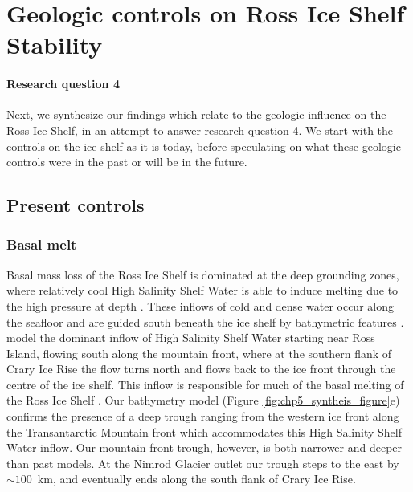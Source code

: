 \section[Geologic controls]{Geologic controls on Ross Ice Shelf Stability}
\paragraph*{Research question 4}

Next, we synthesize our findings which relate to the geologic influence on the Ross Ice Shelf, in an attempt to answer research question 4. We start with the controls on the ice shelf as it is today, before speculating on what these geologic controls were in the past or will be in the future. 

\subsection{Present controls}

\subsubsection{Basal melt}
Basal mass loss of the Ross Ice Shelf is dominated at the deep grounding zones, where relatively cool High Salinity Shelf Water is able to induce melting due to the high pressure at depth \citep{adusumilliinterannual2020, tintoross2019}. These inflows of cold and dense water occur along the seafloor and are guided south beneath the ice shelf by bathymetric features \citep{hollandmodel2008}. \citet{tintoross2019} model the dominant inflow of High Salinity Shelf Water starting near Ross Island, flowing south along the mountain front, where at the southern flank of Crary Ice Rise the flow turns north and flows back to the ice front through the centre of the ice shelf. This inflow is responsible for much of the basal melting of the Ross Ice Shelf \citep{tintoross2019, adusumilliinterannual2020}. Our bathymetry model (Figure \ref{fig:chp5_syntheis_figure}e) confirms the presence of a deep trough ranging from the western ice front along the Transantarctic Mountain front which accommodates this High Salinity Shelf Water inflow. Our mountain front trough, however, is both narrower and deeper than past models. At the Nimrod Glacier outlet our trough steps to the east by $\sim100$~km, and eventually ends along the south flank of Crary Ice Rise. \\

